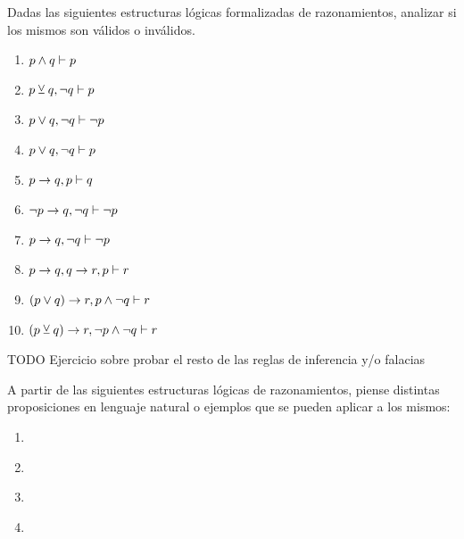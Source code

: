 \begin{exercise}
    Dadas las siguientes estructuras lógicas formalizadas de razonamientos,
    analizar si los mismos son válidos o inválidos.

    \begin{enumerate}
        \item $p \land q \vdash p$
        \item $p \veebar q, \lnot q \vdash p$
        \item $p \lor q, \lnot q \vdash \lnot p$
        \item $p \lor q, \lnot q \vdash p$
        \item $p \to q, p \vdash q$
        \item $\lnot p \to q, \lnot q \vdash \lnot p$
        \item $p \to q, \lnot q \vdash \lnot p$
        \item $p \to q, q \to r, p \vdash r$
        \item $(p \lor q) \to r, p \land \lnot q \vdash r$
        \item $(p \veebar q) \to r, \lnot p \land \lnot q \vdash r$
    \end{enumerate}
\end{exercise}

TODO Ejercicio sobre probar el resto de las reglas de inferencia y/o falacias

\begin{exercise}
    A partir de las siguientes estructuras lógicas de razonamientos, piense
    distintas proposiciones en lenguaje natural o ejemplos que se pueden aplicar
    a los mismos:

    \begin{enumerate}
        \item
            \begin{lreasoning}[width=0.4\textwidth]
            \end{lreasoning}

        \item
            \begin{lreasoning}[width=0.4\textwidth]
            \end{lreasoning}

        \item
            \begin{lreasoning}[width=0.4\textwidth]
            \end{lreasoning}

        \item
            \begin{lreasoning}[width=0.4\textwidth]
            \end{lreasoning}
     \end{enumerate}
\end{exercise}


